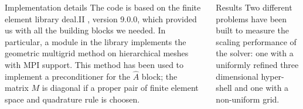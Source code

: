 \documentclass[final]{beamer}
\newlength{\onecolwid}
\begin{document}
\begin{frame}[t]
\begin{columns}[t]
\begin{column}{\onecolwid}
\begin{block}{Implementation details}
The code is based on the finite element library deal.II \cite{dealII90},
version 9.0.0, which provided us with all the building blocks we needed. In
particular, a module in the library implements the geometric multigrid method
on hierarchical meshes with MPI support. This method has been used to implement
a preconditioner for the $\hat{A}$ block; the matrix $M$ is diagonal if a
proper pair of finite element space and quadrature rule is choosen. 
\end{block}

\end{column} %


\begin{column}{\onecolwid} %

\begin{block}{Results}
Two different problems have been built to measure the scaling
performance of the solver: one with a uniformly refined three dimensional
hyper-shell and one with a non-uniform grid.


\end{block}
\end{column}
\end{columns}
\end{frame}
\end{document}
